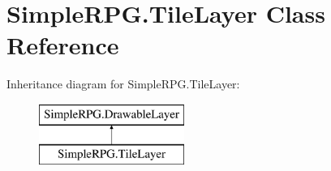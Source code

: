 \hypertarget{class_simple_r_p_g_1_1_tile_layer}{\section{Simple\-R\-P\-G.\-Tile\-Layer Class Reference}
\label{class_simple_r_p_g_1_1_tile_layer}
}
Inheritance diagram for Simple\-R\-P\-G.\-Tile\-Layer\-:\begin{figure}[H]
\begin{center}
\leavevmode
\includegraphics[height=2.000000cm]{class_simple_r_p_g_1_1_tile_layer}
\end{center}
\end{figure}
